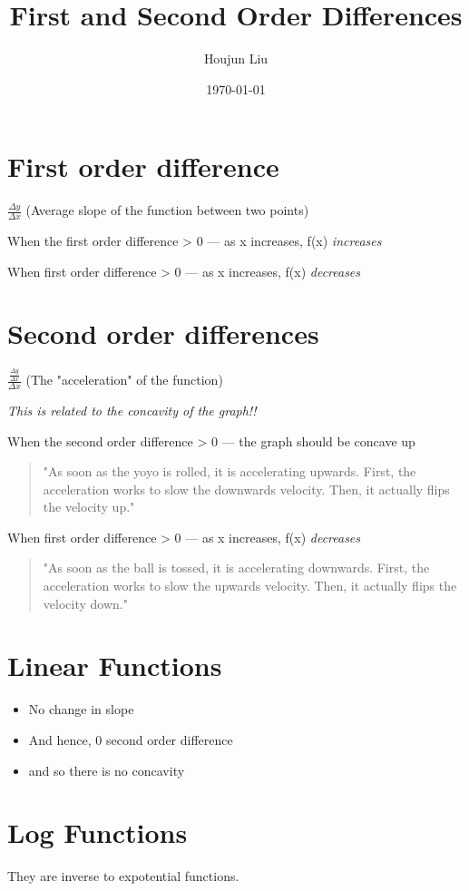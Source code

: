 \documentclass[letterpaper]{article}
\author{Houjun Liu}
\date{\today}
\title{First and Second Order Differences}
\renewcommand{\tableofcontents}{}
\begin{document}
\tableofcontents



\section{First order difference}
\label{sec:org477f547}
\(\frac{\Delta y}{\Delta x}\) (Average slope of the function between two
points)

When the first order difference > 0 --- as x increases, f(x) \emph{increases}

When first order difference > 0 --- as x increases, f(x) \emph{decreases}

\section{Second order differences}
\label{sec:org18dd19f}
\(\frac{\frac{\Delta y}{\Delta x}}{\Delta x}\) (The "acceleration" of
the function)

\emph{This is related to the concavity of the graph!!}

When the second order difference > 0 --- the graph should be concave up

\begin{quote}
"As soon as the yoyo is rolled, it is accelerating upwards. First, the
acceleration works to slow the downwards velocity. Then, it actually
flips the velocity up."
\end{quote}

When first order difference > 0 --- as x increases, f(x) \emph{decreases}

\begin{quote}
"As soon as the ball is tossed, it is accelerating downwards. First,
the acceleration works to slow the upwards velocity. Then, it actually
flips the velocity down."
\end{quote}

\section{Linear Functions}
\label{sec:org1813bdc}
\begin{itemize}
\item No change in slope
\item And hence, 0 second order difference
\item and so there is no concavity
\end{itemize}

\section{Log Functions}
\label{sec:org081f17f}
They are inverse to expotential functions.
\end{document}
